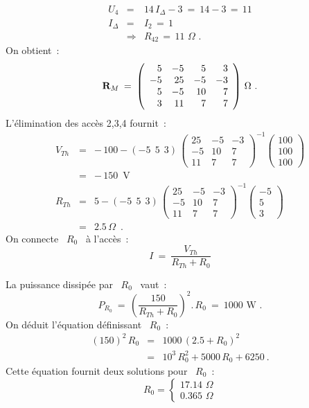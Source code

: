 \begin{eqnarray*}
	U_4 &=& 14\, I_{\Delta} - 3 \: = \: 14-3 \, = \, 11\\
	I_{\Delta} &=& I_2 \, = \, 1\\
	& \Rightarrow & R_{42} \, = \, 11\,\, \Omega\text{~.}
\end{eqnarray*}
On obtient~:
\[ {\bf R}_M \: = \: 
\left( \begin{array}{rrrr}
5 & -5 & 5 & 3\\
-5 & 25 & -5 & -3\\ 
5 & -5 & 10 & 7\\
3 & 11 & 7 & 7
\end{array} \right)\,\Omega\text{~.} \]
L'élimination des accès 2,3,4 fournit~:
\begin{eqnarray*}
	V_{Th} &=& -\, 100 - \left( -5 ~~5~~3 \right) \, 
	\left( \begin{array}{rrr}
		25 & -5 & -3\\
		-5 & 10 & 7\\
		11 & 7 & 7
	\end{array} \right) ^{-1}
	\left( \begin{array}{c} 100\\ 100\\ 100 \end{array} \right)\\
	&=& -\, 150\, \text{~V}\\
	R_{Th} &=& 5 - \left( -5 ~~5 ~~3 \right) \,
	\left( \begin{array}{rrr}
		25 & -5 & -3\\
		-5 & 10 & 7\\
		11 & 7 & 7
	\end{array} \right) ^{-1}
	\left( \begin{array}{r} -5\\ 5\\ 3 \end{array} \right)\\
	&=& 2.5\, \Omega \,\text{~.}
\end{eqnarray*}
On connecte \ $R_0$ \ à l'accès~:
\[I \: = \: \dfrac{V_{Th}}{R_{Th} + R_0}\]

La puissance dissipée par \ $R_0$ \ vaut~:
\[ P_{R_0} \: = \, \left( \frac{150}{R_{Th}+ R_0} \right)^2.\, R_0 \:= \: 1000\,\, \text{W~.} \]
On déduit l'équation définissant \ $R_0$~:
\begin{eqnarray*}
	(150)^2\, R_0 
	&=& 1000 \, (2.5 + R_0)^2\\
	&=& 10^3\, R_0^2 + 5000\, R_0 + 6250~.
\end{eqnarray*}
Cette équation fournit deux solutions pour \ $R_0$~:
\[ R_0 =
\begin{cases}
17.14 \,\,\Omega\\
0.365\,\,\Omega
\end{cases}\]



